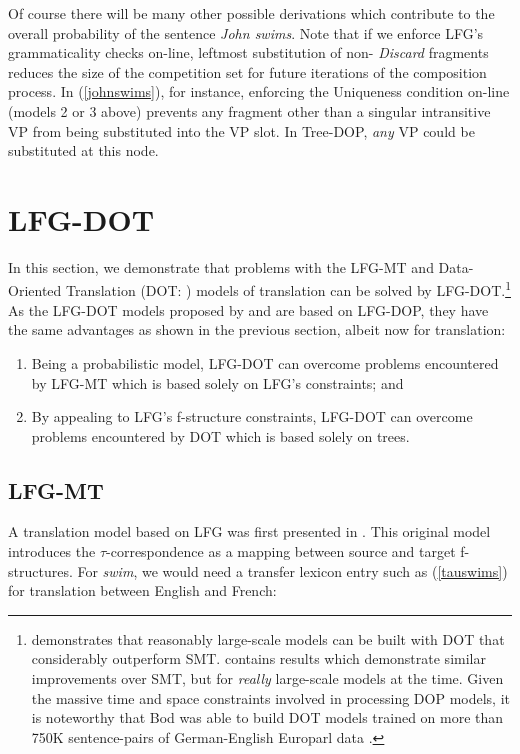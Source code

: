 \documentclass[output=paper,hidelinks]{langscibook}
\begin{document}
Of course there will be many other possible derivations which contribute to the overall probability of the sentence {\em John swims}. Note that if we enforce LFG's grammaticality checks on-line, leftmost substitution of non-{\em
Discard} fragments reduces the size of the competition set for future iterations of the composition process. In (\ref{johnswims}), for instance, enforcing the Uniqueness condition on-line (models 2 or 3 above) prevents any fragment other than a singular intransitive VP from being substituted into the VP slot. In Tree-DOP, {\em any} VP could be substituted at this node.

\section{LFG-DOT}
In this section, we demonstrate that problems with the LFG-MT \citep{kaplanetal1989} and Data-Oriented Translation (DOT: \citet{DOT}) models of translation can be solved by LFG-DOT.\footnote{\citet{Hearne} demonstrates that reasonably large-scale models can be built with DOT that considerably outperform SMT. \citet{BodMTS} contains results which demonstrate similar improvements over SMT, but for {\em really} large-scale models at the time. Given the massive time and space constraints involved in processing DOP models, it is noteworthy that Bod was able to build DOT models trained on more than 750K sentence-pairs of  German-English Europarl data \citep{Koehn}.} As the LFG-DOT models proposed by \citet{Way99} and \citet{Way01} are based on LFG-DOP, they have the same advantages as shown in the previous section, albeit now for translation:
\begin{enumerate}
    \item Being a probabilistic model, LFG-DOT can overcome problems encountered by LFG-MT which is based solely on LFG's constraints; and
    \item By appealing to LFG's f-structure constraints, LFG-DOT can overcome problems encountered by DOT which is based solely on trees.
\end{enumerate}

\subsection{LFG-MT}
A translation model based on LFG was first presented in \citet{kaplanetal1989}. This original model introduces the $\tau$-correspondence as a mapping between source and target f-structures. For {\em swim}, we would need a transfer lexicon entry such as (\ref{tauswims}) for translation between English and French:
\end{document}

